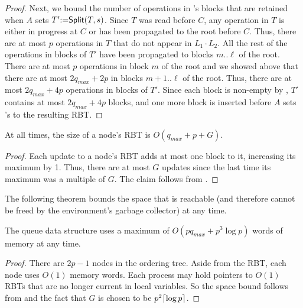 \begin{proof}
Next, we bound the number of operations in 's blocks that are retained when $A$  sets
$T'\mbox{:=}{\sf Split}(T,s)$.
Since $T$ was read before $C$, any operation in $T$ is either in progress at $C$ or has been propagated to the root before $C$.
Thus, there are at most $p$ operations in $T$ that do not appear in $L_1\cdot L_2$.
All the rest of the operations in blocks of $T'$ have been propagated to blocks $m..\ell$ of the root.
There are at most $p$ operations in block $m$ of the root %
and we showed above that there are at most $2q_{max} + 2p$ in blocks 
$m+1..\ell$ of the root.
Thus, there are at most $2q_{max}+4p$ operations in blocks of $T'$.
Since each block is non-empty by , $T'$ contains at most $2q_{max}+4p$ blocks, and one more 
block is inserted before $A$ sets 's  to the resulting RBT.
\end{proof}


\begin{corollary}\label{RBTbound}
At all times, the size of a node's RBT is $O(q_{max}+p+G)$. 
\end{corollary}
\begin{proof}
Each update to a node's RBT adds at most one block to it, increasing its maximum  by 1.
Thus, there are at most $G$ updates since the last time its maximum  was a multiple of $G$.
The claim follows from .
\end{proof}

The following theorem bounds the space that is reachable (and therefore cannot be freed by the environment's garbage collector) at any time.

\begin{mytheorem}\label{spaceBound}
The queue data structure uses a maximum of $O(pq_{max}+p^3\log p)$ words of memory at any time.
\end{mytheorem}
\begin{proof}
There are $2p-1$ nodes in the ordering tree.  Aside from the RBT, each node uses $O(1)$ memory words.
Each process may hold pointers to $O(1)$ RBTs that are no longer current in local variables.
So the space bound follows from  and the fact that $G$ is chosen
to be $p^2\lceil \log p \rceil$.
\end{proof}

